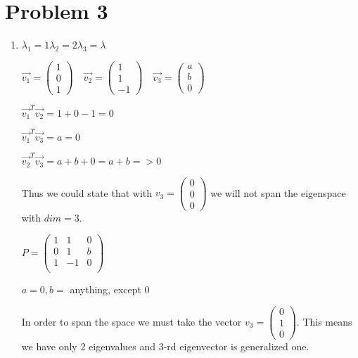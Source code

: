 \documentclass[12pt,letterpaper]{article}
\begin{document}
\section*{Problem 3}
    \begin{enumerate}[label=(\alph*)]
        \item
        $\lambda_1 = 1 \lambda_2 = 2 \lambda_3 = \lambda$
        
        $\vec{v_1} = \begin{pmatrix} 1 \\ 0 \\ 1 \end{pmatrix} \quad
         \vec{v_2} = \begin{pmatrix} 1 \\ 1 \\ -1 \end{pmatrix} \quad
         \vec{v_3} = \begin{pmatrix} a \\ b \\ 0 \end{pmatrix}$
         
        $\vec{v_1}^T \vec{v_2} = 1 + 0 - 1 = 0$
        
        $\vec{v_1}^T \vec{v_3} = a = 0$
        
        $\vec{v_2}^T \vec{v_3} = a + b + 0 = a + b => 0$ 
        
        Thus we could state that with $v_3 = \begin{pmatrix} 0 \\ 0 \\ 0 \end{pmatrix}$ we will not span the eigenspace with $dim = 3$.
        
        $P = \begin{pmatrix}
            1 & 1 & 0 \\
            0 & 1 & b \\
            1 & -1 & 0 \\
        \end{pmatrix}$
        
        $a = 0, b = $ anything, except 0
        
        In order to span the space we must take the vector $v_3 = \begin{pmatrix} 0 \\ 1 \\ 0 \end{pmatrix}$. This means we have only 2 eigenvalues and 3-rd eigenvector is generalized one.
        

\end{enumerate}
\end{document}
